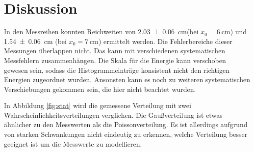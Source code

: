 \section{Diskussion}
In den Messreihen konnten Reichweiten von \qty{2.03 \pm 0.06}{\cm}(bei $x_0 = \qty{6}{\cm}$)  und 
\qty{1.54 \pm 0.06}{\cm} (bei $x_0 = \qty{7}{\cm}$) ermittelt werden.
Die Fehlerbereiche dieser Messungen überlappen nicht.
Das kann mit verschiedenen systematischen Messfehlern zusammenhängen.
Die Skala für die Energie kann verschoben gewesen sein, sodass die Histogrammeinträge
konsistent nicht den richtigen Energien zugeordnet wurden.
Ansonsten kann es noch zu weiteren systematischen Verschiebungen gekommen sein, die hier nicht beachtet wurden.

In Abbildung \ref{fig:stat} wird die gemessene Verteilung mit zwei Wahrscheinlichkeitsverteilungen verglichen.
Die Gaußverteilung ist etwas ähnlicher zu den Messwerten als die Poissonverteilung.
Es ist allerdings aufgrund von starken Schwankungen nicht eindeutig zu erkennen, welche Verteilung besser geeignet ist um
die Messwerte zu modellieren.